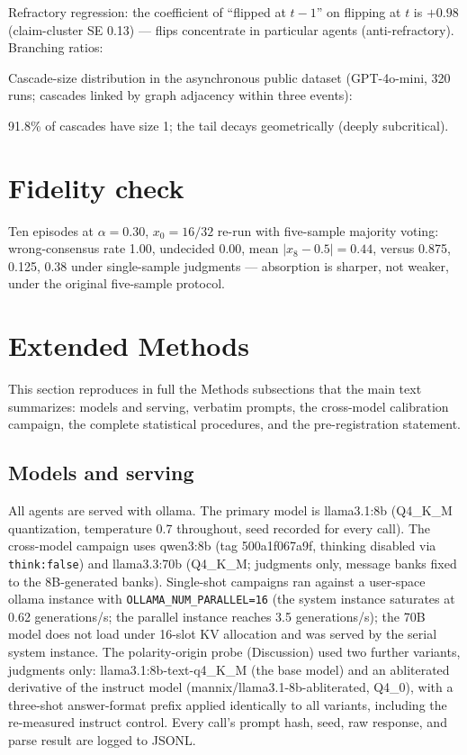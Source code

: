 \documentclass[11pt]{article}
\begin{document}
Refractory regression: the coefficient of ``flipped at $t-1$'' on flipping at
$t$ is $+0.98$ (claim-cluster SE 0.13) --- flips concentrate in particular
agents (anti-refractory). Branching ratios:
\begin{center}

\end{center}
Cascade-size distribution in the asynchronous public dataset (GPT-4o-mini,
320 runs; cascades linked by graph adjacency within three events):
\begin{center}

\end{center}
91.8\% of cascades have size 1; the tail decays geometrically (deeply
subcritical).

\section{Fidelity check}

Ten episodes at $\alpha = 0.30$, $x_0 = 16/32$ re-run with five-sample
majority voting: wrong-consensus rate 1.00, undecided 0.00, mean
$|x_8 - 0.5| = 0.44$, versus 0.875, 0.125, 0.38 under single-sample
judgments --- absorption is sharper, not weaker, under the original
five-sample protocol.

\section{Extended Methods}\label{si:methods}

This section reproduces in full the Methods subsections that the main text
summarizes: models and serving, verbatim prompts, the cross-model
calibration campaign, the complete statistical procedures, and the
pre-registration statement.

\subsection{Models and serving}

All agents are served with ollama. The primary model is llama3.1:8b
(Q4\_K\_M quantization, temperature 0.7 throughout, seed recorded for every
call). The cross-model campaign uses qwen3:8b (tag 500a1f067a9f, thinking
disabled via \texttt{think:false}) and llama3.3:70b (Q4\_K\_M; judgments
only, message banks fixed to the 8B-generated banks). Single-shot campaigns
ran against a user-space ollama instance with \texttt{OLLAMA\_NUM\_PARALLEL=16}
(the system instance saturates at 0.62 generations/s; the parallel instance
reaches 3.5 generations/s); the 70B model does not load under 16-slot KV
allocation and was served by the serial system instance. The polarity-origin probe (Discussion) used two further variants, judgments
only: llama3.1:8b-text-q4\_K\_M (the base model) and an abliterated derivative
of the instruct model (mannix/llama3.1-8b-abliterated, Q4\_0), with a
three-shot answer-format prefix applied identically to all variants,
including the re-measured instruct control. Every call's prompt
hash, seed, raw response, and parse result are logged to JSONL.
\end{document}
